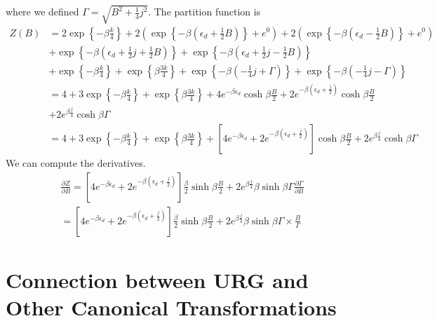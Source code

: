 \documentclass[12pt,twoside]{article}
\numberwithin{equation}{section}
\begin{document}
where we defined \(\Gamma = \sqrt{B^2 + \frac{1}{4}j^2}\). The partition function is
\begin{equation}\begin{aligned}
	Z(B) &= 2 \exp\left\{-\beta \frac{k}{4}\right\} + 2\left( \exp\left\{-\beta\left(\epsilon_d + \frac{1}{2} B\right)\right\} + e^0\right) + 2\left( \exp\left\{-\beta\left(\epsilon_d - \frac{1}{2} B\right)\right\} + e^0\right) \\
	     &+ \exp\left\{-\beta\left(\epsilon_d + \frac{1}{2}j + \frac{1}{2} B\right)\right\} + \exp\left\{-\beta\left(\epsilon_d + \frac{1}{2}j - \frac{1}{2} B\right)\right\} \\
	     &+ \exp\left\{-\beta \frac{k}{4}\right\} + \exp\left\{\beta \frac{3k}{4}\right\} + \exp\left\{-\beta\left( - \frac{1}{4}j + \Gamma\right)\right\} + \exp\left\{-\beta\left( - \frac{1}{4}j - \Gamma\right)\right\}\\
	     &= 4 + 3\exp\left\{-\beta \frac{k}{4}\right\} + \exp\left\{\beta \frac{3k}{4}\right\} + 4e^{-\beta \epsilon_d}\cosh \beta \frac{B}{2} + 2e^{-\beta \left(\epsilon_d + \frac{j}{2}\right)}\cosh \beta \frac{B}{2}\\
	     &+ 2e^{\beta \frac{j}{4}}\cosh \beta \Gamma\\
	     &= 4 + 3\exp\left\{-\beta \frac{k}{4}\right\} + \exp\left\{\beta \frac{3k}{4}\right\} + \left[4e^{-\beta \epsilon_d} + 2e^{-\beta \left(\epsilon_d + \frac{j}{2}\right)}\right]\cosh \beta \frac{B}{2} + 2e^{\beta \frac{j}{4}}\cosh \beta \Gamma
\end{aligned}\end{equation}
We can compute the derivatives.
\begin{equation}\begin{aligned}
	\frac{\partial{Z}}{\partial{B}} = \left[4e^{-\beta \epsilon_d} + 2e^{-\beta \left(\epsilon_d + \frac{j}{2}\right)}\right] \frac{\beta}{2}\sinh \beta \frac{B}{2} + 2e^{\beta \frac{j}{4}}\beta \sinh \beta \Gamma \frac{\partial{\Gamma}}{\partial{B}} \\
	= \left[4e^{-\beta \epsilon_d} + 2e^{-\beta \left(\epsilon_d + \frac{j}{2}\right)}\right] \frac{\beta}{2}\sinh \beta \frac{B}{2} + 2e^{\beta \frac{j}{4}}\beta \sinh \beta \Gamma \times \frac{B}{\Gamma}
\end{aligned}\end{equation}

\section{Connection between URG and Other Canonical Transformations}
\end{document}
